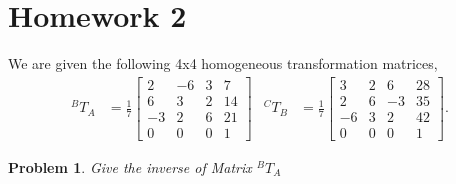 \documentclass{article}
\newtheorem{prob}{Problem}
\numberwithin{prob}{section}
\begin{document}
\section{Homework 2}
We are given the following 4x4 homogeneous transformation matrices,
\begin{align}
  ^BT_A &= \frac{1}{7}\begin{bmatrix}
    2 & -6 & 3 & 7\\
    6 & 3& 2 & 14\\
    -3 & 2 & 6 & 21\\
    0 & 0 & 0 & 1
  \end{bmatrix}
        &
    ^CT_B &= \frac{1}{7}\begin{bmatrix}
    3 & 2 & 6 & 28\\
    2 & 6 & -3 & 35\\
    -6 & 3 & 2 & 42\\
    0 & 0 & 0 & 1
    \end{bmatrix}.
\end{align}
\begin{prob}
  Give the inverse of Matrix $^BT_A$
\end{prob}
\end{document}
